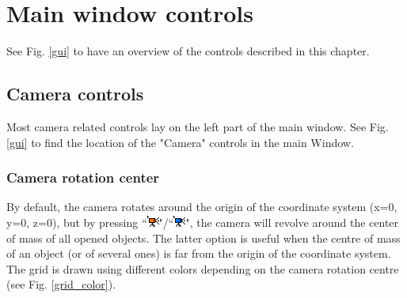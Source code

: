 \chapter{Main window controls}
\minitoc  


See Fig. \ref{gui} to have an overview of the controls described in this chapter.



 \section{Camera controls}
Most camera related controls lay on the left part of the main window. See Fig. \ref{gui} to find the location of the "Camera" controls in the main Window.
\subsection{Camera rotation center}
By default, the camera rotates around the origin of the coordinate system (x=0, y=0, z=0), but by pressing ``\includegraphics[scale=0.7]{images/06/camera/move_cam.png}"/``\includegraphics[scale=0.7]{images/06/camera/move_cam2.png}", the camera will revolve around the center of mass of all opened objects. The latter option is useful when the centre of mass of an object (or of several ones) is far from the origin of the coordinate system. The grid is drawn using different colors depending on the camera rotation centre (see Fig. \ref{grid_color}). %

